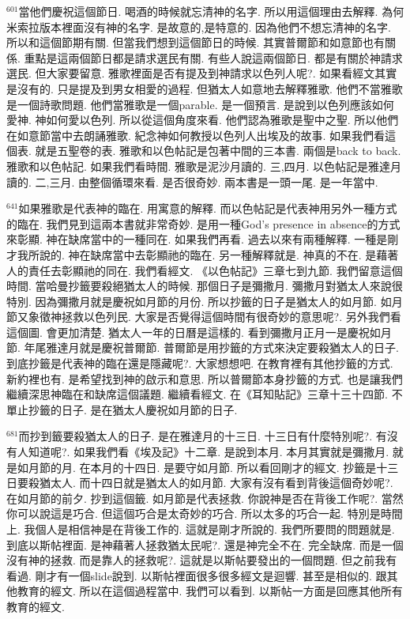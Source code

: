 \documentclass{book}
\begin{document}
$^{601}$當他們慶祝這個節日.
喝酒的時候就忘清神的名字.
所以用這個理由去解釋.
為何米索拉版本裡面沒有神的名字.
是故意的,是特意的.
因為他們不想忘清神的名字.
所以和這個節期有關.
但當我們想到這個節日的時候.
其實普爾節和如意節也有關係.
重點是這兩個節日都是請求選民有關.
有些人說這兩個節日.
都是有關於神請求選民.
但大家要留意.
雅歌裡面是否有提及到神請求以色列人呢?.
如果看經文其實是沒有的.
只是提及到男女相愛的過程.
但猶太人如意地去解釋雅歌.
他們不當雅歌是一個詩歌問題.
他們當雅歌是一個parable.
是一個預言.
是說到以色列應該如何愛神.
神如何愛以色列.
所以從這個角度來看.
他們認為雅歌是聖中之聖.
所以他們在如意節當中去朗誦雅歌.
紀念神如何教授以色列人出埃及的故事.
如果我們看這個表.
就是五聖卷的表.
雅歌和以色帖記是包著中間的三本書.
兩個是back to back.
雅歌和以色帖記.
如果我們看時間.
雅歌是泥沙月讀的.
三,四月.
以色帖記是雅達月讀的.
二,三月.
由整個循環來看.
是否很奇妙.
兩本書是一頭一尾.
是一年當中.

$^{641}$如果雅歌是代表神的臨在.
用寓意的解釋.
而以色帖記是代表神用另外一種方式的臨在.
我們見到這兩本書就非常奇妙.
是用一種God's presence in absence的方式來彰顯.
神在缺席當中的一種同在.
如果我們再看.
過去以來有兩種解釋.
一種是剛才我所說的.
神在缺席當中去彰顯祂的臨在.
另一種解釋就是.
神真的不在.
是藉著人的責任去彰顯祂的同在.
我們看經文.
《以色帖記》三章七到九節.
我們留意這個時間.
當哈曼抄籤要殺絕猶太人的時候.
那個日子是彌撒月.
彌撒月對猶太人來說很特別.
因為彌撒月就是慶祝如月節的月份.
所以抄籤的日子是猶太人的如月節.
如月節又象徵神拯救以色列民.
大家是否覺得這個時間有很奇妙的意思呢?.
另外我們看這個圖.
會更加清楚.
猶太人一年的日曆是這樣的.
看到彌撒月正月一是慶祝如月節.
年尾雅達月就是慶祝普爾節.
普爾節是用抄籤的方式來決定要殺猶太人的日子.
到底抄籤是代表神的臨在還是隱藏呢?.
大家想想吧.
在教育裡有其他抄籤的方式.
新約裡也有.
是希望找到神的啟示和意思.
所以普爾節本身抄籤的方式.
也是讓我們繼續深思神臨在和缺席這個議題.
繼續看經文.
在《耳知貼記》三章十三十四節.
不單止抄籤的日子.
是在猶太人慶祝如月節的日子.

$^{681}$而抄到籤要殺猶太人的日子.
是在雅達月的十三日.
十三日有什麼特別呢?.
有沒有人知道呢?.
如果我們看《埃及記》十二章.
是說到本月.
本月其實就是彌撒月.
就是如月節的月.
在本月的十四日.
是要守如月節.
所以看回剛才的經文.
抄籤是十三日要殺猶太人.
而十四日就是猶太人的如月節.
大家有沒有看到背後這個奇妙呢?.
在如月節的前夕.
抄到這個籤.
如月節是代表拯救.
你說神是否在背後工作呢?.
當然你可以說這是巧合.
但這個巧合是太奇妙的巧合.
所以太多的巧合一起.
特別是時間上.
我個人是相信神是在背後工作的.
這就是剛才所說的.
我們所要問的問題就是.
到底以斯帖裡面.
是神藉著人拯救猶太民呢?.
還是神完全不在.
完全缺席.
而是一個沒有神的拯救.
而是靠人的拯救呢?.
這就是以斯帖要發出的一個問題.
但之前我有看過.
剛才有一個slide說到.
以斯帖裡面很多很多經文是迴響.
甚至是相似的.
跟其他教育的經文.
所以在這個過程當中.
我們可以看到.
以斯帖一方面是回應其他所有教育的經文.
\end{document}
